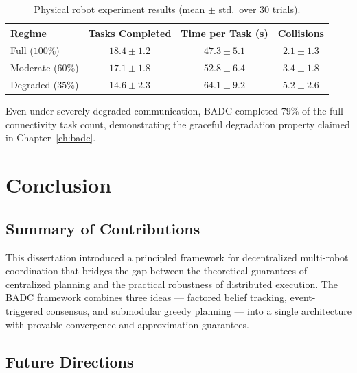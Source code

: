 \documentclass[12pt,oneside]{report}
\theoremstyle{definition}
\theoremstyle{remark}
\begin{document}
\begin{table}[htbp]
\centering
\caption{Physical robot experiment results (mean $\pm$ std.\ over 30 trials).}
\label{tab:physical}
\vspace{4pt}
\begin{tabular}{@{}p{2.5cm} c c c@{}}
\toprule
\color{jhublue}\textbf{Regime} &
\color{jhublue}\textbf{Tasks Completed} &
\color{jhublue}\textbf{Time per Task (s)} &
\color{jhublue}\textbf{Collisions} \\
\midrule
Full ($100\%$)       & $18.4 \pm 1.2$  & $47.3 \pm 5.1$  & $2.1 \pm 1.3$  \\
Moderate ($60\%$)    & $17.1 \pm 1.8$  & $52.8 \pm 6.4$  & $3.4 \pm 1.8$  \\
Degraded ($35\%$)    & $14.6 \pm 2.3$  & $64.1 \pm 9.2$  & $5.2 \pm 2.6$  \\
\bottomrule
\end{tabular}
\vspace{4pt}
\end{table}

Even under severely degraded communication, BADC completed $79\%$ of the
full-connectivity task count, demonstrating the graceful degradation property
claimed in Chapter~\ref{ch:badc}.

\chapter{Conclusion}
\label{ch:conclusion}

\section{Summary of Contributions}

This dissertation introduced a principled framework for decentralized multi-robot
coordination that bridges the gap between the theoretical guarantees of centralized
planning and the practical robustness of distributed execution. The BADC framework
combines three ideas --- factored belief tracking, event-triggered consensus, and
submodular greedy planning --- into a single architecture with provable convergence
and approximation guarantees.

\section{Future Directions}
\end{document}
